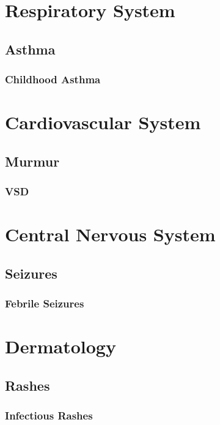 \documentclass[
]{book}
\begin{document}
\part{Respiratory System}\label{part-respiratory-system}

\chapter{Asthma}\label{Asthma}

\section{Childhood Asthma}\label{ChAs}

\part{Cardiovascular System}\label{part-cardiovascular-system}

\chapter{Murmur}\label{Murmur}

\section{VSD}\label{VSD}

\part{Central Nervous System}\label{part-central-nervous-system}

\chapter{Seizures}\label{Seizures}

\section{Febrile Seizures}\label{FebSz}

\part{Dermatology}\label{part-dermatology}

\chapter{Rashes}\label{Rashes}

\section{Infectious Rashes}\label{InfRash}

  
\end{document}
